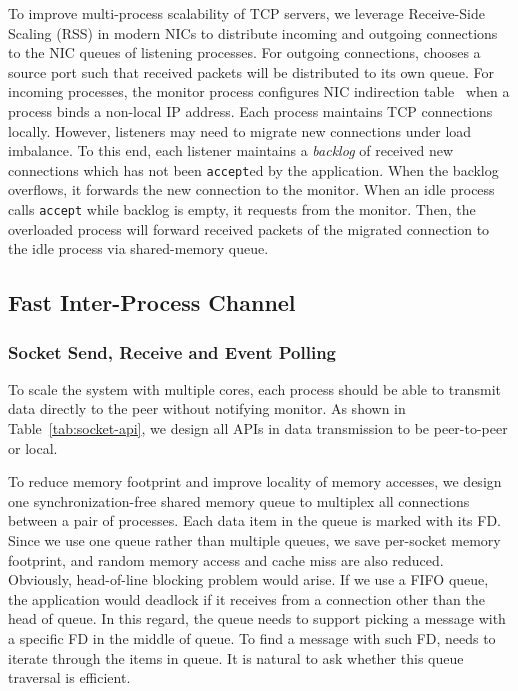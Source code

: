 To improve multi-process scalability of TCP servers, we leverage Receive-Side Scaling (RSS) in modern NICs to distribute incoming and outgoing connections to the NIC queues of listening processes. For outgoing connections, \libipc{} chooses a source port such that received packets will be distributed to its own queue. For incoming processes, the monitor process configures NIC indirection table~\cite{mellanox} when a process binds a non-local IP address. Each process maintains TCP connections locally. However, listeners may need to migrate new connections under load imbalance. To this end, each listener maintains a \textit{backlog} of received new connections which has not been \texttt{accept}ed by the application. When the backlog overflows, it forwards the new connection to the monitor. When an idle process calls \texttt{accept} while backlog is empty, it requests from the monitor. Then, the overloaded process will forward received packets of the migrated connection to the idle process via shared-memory queue.


\subsection{Fast Inter-Process Channel}
\label{subsec:inter-process-channel}

\subsubsection{Socket Send, Receive and Event Polling}
\label{subsubsec:data_trans}

To scale the system with multiple cores, each process should be able to transmit data directly to the peer without notifying monitor. As shown in Table~\ref{tab:socket-api}, we design all APIs in data transmission to be peer-to-peer or local.

To reduce memory footprint and improve locality of memory accesses, we design one synchronization-free shared memory queue to multiplex all connections between a pair of processes. Each data item in the queue is marked with its FD. Since we use one queue rather than multiple queues, we save per-socket memory footprint, and random memory access and cache miss are also reduced. Obviously, head-of-line blocking problem would arise. If we use a FIFO queue, the application would deadlock if it receives from a connection other than the head of queue. In this regard, the queue needs to support picking a message with a specific FD in the middle of queue. To find a message with such FD, \libipc{} needs to iterate through the items in queue. It is natural to ask whether this queue traversal is efficient.

